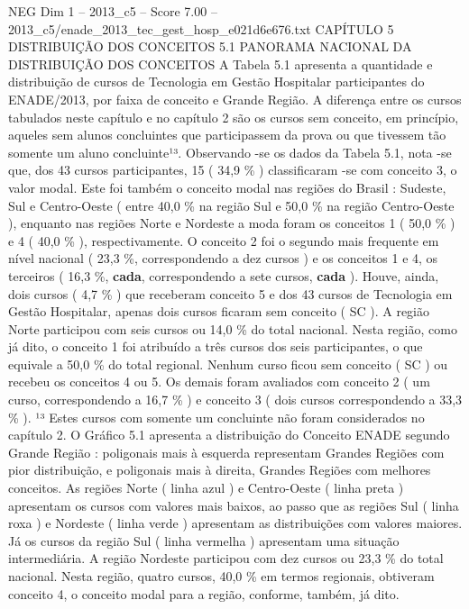 \begin{textsample}{NEG Dim 1 – 2013\_c5 – Score 7.00 – 2013\_c5/enade\_2013\_tec\_gest\_hosp\_e021d6e676.txt}  \label{ex:f1_neg_352}
CAPÍTULO 5 DISTRIBUIÇÃO DOS CONCEITOS 5.1 PANORAMA NACIONAL DA DISTRIBUIÇÃO DOS CONCEITOS A Tabela 5.1 apresenta a quantidade e distribuição de cursos de Tecnologia em Gestão Hospitalar participantes do ENADE/2013, por faixa de conceito e Grande Região.
A diferença entre os cursos tabulados neste capítulo e no capítulo 2 são os cursos sem conceito, em princípio, aqueles sem alunos concluintes que participassem da prova ou que tivessem tão somente um aluno concluinte¹³.
Observando -se os dados da Tabela 5.1, nota -se que, dos 43 cursos participantes, 15 ( 34,9 \% ) classificaram -se com conceito 3, o valor modal.
Este foi também o conceito modal nas regiões do Brasil : Sudeste, Sul e Centro-Oeste ( entre 40,0 \% na região Sul e 50,0 \% na região Centro-Oeste ), enquanto nas regiões Norte e Nordeste a moda foram os conceitos 1 ( 50,0 \% ) e 4 ( 40,0 \% ), respectivamente.
O conceito 2 foi o segundo mais frequente em nível nacional ( 23,3 \%, correspondendo a dez cursos ) e os conceitos 1 e 4, os terceiros ( 16,3 \%, \textbf{cada}, correspondendo a sete cursos, \textbf{cada} ).
Houve, ainda, dois cursos ( 4,7 \% ) que receberam conceito 5 e dos 43 cursos de Tecnologia em Gestão Hospitalar, apenas dois cursos ficaram sem conceito ( SC ).
A região Norte participou com seis cursos ou 14,0 \% do total nacional.
Nesta região, como já dito, o conceito 1 foi atribuído a três cursos dos seis participantes, o que equivale a 50,0 \% do total regional.
Nenhum curso ficou sem conceito ( SC ) ou recebeu os conceitos 4 ou 5.
Os demais foram avaliados com conceito 2 ( um curso, correspondendo a 16,7 \% ) e conceito 3 ( dois cursos correspondendo a 33,3 \% ). ¹³ Estes cursos com somente um concluinte não foram considerados no capítulo 2.
O Gráfico 5.1 apresenta a distribuição do Conceito ENADE segundo Grande Região : poligonais mais à esquerda representam Grandes Regiões com pior distribuição, e poligonais mais à direita, Grandes Regiões com melhores conceitos.
As regiões Norte ( linha azul ) e Centro-Oeste ( linha preta ) apresentam os cursos com valores mais baixos, ao passo que as regiões Sul ( linha roxa ) e Nordeste ( linha verde ) apresentam as distribuições com valores maiores.
Já os cursos da região Sul ( linha vermelha ) apresentam uma situação intermediária.
A região Nordeste participou com dez cursos ou 23,3 \% do total nacional.
Nesta região, quatro cursos, 40,0 \% em termos regionais, obtiveram conceito 4, o conceito modal para a região, conforme, também, já dito.

\end{textsample}
